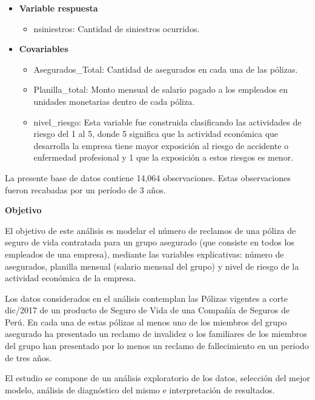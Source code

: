 \documentclass[]{article}
\providecommand{\tightlist}{%
  \setlength{\itemsep}{0pt}\setlength{\parskip}{0pt}}
\begin{document}
\begin{itemize}
\tightlist
\item
  \textbf{Variable respuesta}

  \begin{itemize}
  \tightlist
  \item
    nsiniestros: Cantidad de siniestros ocurridos.
  \end{itemize}
\item
  \textbf{Covariables}

  \begin{itemize}
  \item
    Asegurados\_Total: Cantidad de asegurados en cada una de las
    pólizas.
  \item
    Planilla\_total: Monto mensual de salario pagado a los empleados en
    unidades monetarias dentro de cada póliza.
  \item
    nivel\_riesgo: Esta variable fue construida clasificando las
    actividades de riesgo del 1 al 5, donde 5 significa que la actividad
    económica que desarrolla la empresa tiene mayor exposición al riesgo
    de accidente o enfermedad profesional y 1 que la exposición a estos
    riesgos es menor.
  \end{itemize}
\end{itemize}

La presente base de datos contiene 14,064 observaciones. Estas
observaciones fueron recabadas por un período de 3 años.

\textbf{Objetivo}

El objetivo de este análisis es modelar el número de reclamos de una
póliza de seguro de vida contratada para un grupo asegurado (que
consiste en todos los empleados de una empresa), mediante las variables
explicativas: número de asegurados, planilla mensual (salario mensual
del grupo) y nivel de riesgo de la actividad económica de la empresa.

Los datos considerados en el análisis contemplan las Pólizas vigentes a
corte dic/2017 de un producto de Seguro de Vida de una Compañía de
Seguros de Perú. En cada una de estas pólizas al menos uno de los
miembros del grupo asegurado ha presentado un reclamo de invalidez o los
familiares de los miembros del grupo han presentado por lo menos un
reclamo de fallecimiento en un periodo de tres años.

El estudio se compone de un análisis exploratorio de los datos,
selección del mejor modelo, análisis de diagnóstico del mismo e
interpretación de resultados.
\end{document}
